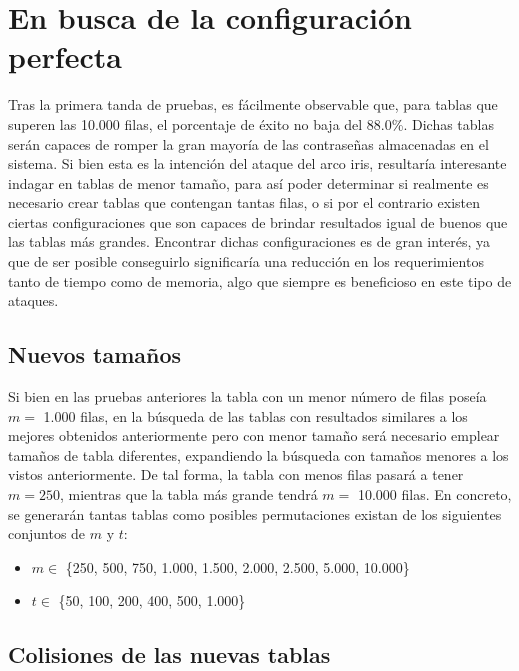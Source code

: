 \documentclass[12pt,spanish,listoffigures,listoftables,listofalgorithms]{tfgetsinf}
\begin{document}
\section{En busca de la configuración perfecta} \label{config perf}

Tras la primera tanda de pruebas, es fácilmente observable que, para tablas que superen las 10.000 filas, el porcentaje de éxito no baja del 88.0\%. Dichas tablas serán capaces de romper la gran mayoría de las contraseñas almacenadas en el sistema. Si bien esta es la intención del ataque del arco iris, resultaría interesante indagar en tablas de menor tamaño, para así poder determinar si realmente es necesario crear tablas que contengan tantas filas, o si por el contrario existen ciertas configuraciones que son capaces de brindar resultados igual de buenos que las tablas más grandes. Encontrar dichas configuraciones es de gran interés, ya que de ser posible conseguirlo significaría una reducción en los requerimientos tanto de tiempo como de memoria, algo que siempre es beneficioso en este tipo de ataques.

\subsection{Nuevos tamaños} \label{nuevos_tamaños}

Si bien en las pruebas anteriores la tabla con un menor número de filas poseía $m =$ 1.000 filas, en la búsqueda de las tablas con resultados similares a los mejores obtenidos anteriormente pero con menor tamaño será necesario emplear tamaños de tabla diferentes, expandiendo la búsqueda con tamaños menores a los vistos anteriormente. De tal forma, la tabla con menos filas pasará a tener $m = 250$, mientras que la tabla más grande tendrá $m =$ 10.000 filas. En concreto, se generarán tantas tablas como posibles permutaciones existan de los siguientes conjuntos de $m$ y $t$:
\\
\begin{itemize}

    \item $m \in$ \{250, 500, 750, 1.000, 1.500, 2.000, 2.500, 5.000, 10.000\}
    
    \item $t \in$ \{50, 100, 200, 400, 500, 1.000\}
    
\end{itemize}

\subsection{Colisiones de las nuevas tablas}
\end{document}
